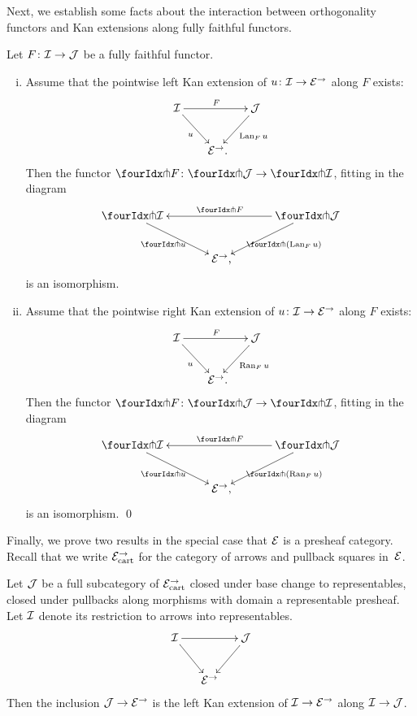\documentclass[reqno,10pt,a4paper,oneside,draft]{amsart}
\begin{document}
{{Next, we establish some facts about the interaction between orthogonality functors and Kan extensions along fully faithful functors. 

\begin{proposition} \label{kan-extension-closure}
Let $F \co \cal{I} \to \cal{J}$ be a fully faithful functor.
\begin{enumerate}[(i)]
\item Assume that the pointwise left Kan extension of $u \co \cal{I} \to \catE^\to$ along $F$ exists:
\[
\xymatrix@!C@C-1em{
  \cal{I}
  \ar[dr]_{u}
  \ar[rr]^{F}
&&
  \cal{J}
  \ar[dl]^{\Lan_F u}
\\&
  \catE^\to
\rlap{.}}
\]
Then the functor $\liftr{F} \co \liftr{\cal{J}} \to \liftr{\cal{I}}$, fitting in the diagram
\[
\xymatrix@!C@C-1em{
  \liftr{\cal{I}}
  \ar[dr]_{\liftr{u}}
&&
  \liftr{\cal{J}}
  \ar[ll]_{\liftr{F}}
  \ar[dl]^{\liftr{(\Lan_F u)}}
\\&
  \catE^\to
\rlap{,}}
\]
is an isomorphism.
\item Assume that the pointwise right Kan extension of $u \co \cal{I} \to \catE^\to$ along $F$ exists:
\[
\xymatrix@!C@C-1em{
  \cal{I}
  \ar[dr]_{u}
  \ar[rr]^{F}
&&
  \cal{J}
  \ar[dl]^{\Ran_F u}
\\&
  \catE^\to
\rlap{.}}
\]
Then the functor $\liftl{F} \co \liftl{\cal{J}} \to \liftl{\cal{I}}$, fitting in the diagram
\[
\xymatrix@!C@C-1em{
  \liftl{\cal{I}}
  \ar[dr]_{\liftl{u}}
&&
  \liftl{\cal{J}}
  \ar[ll]_{\liftl{F}}
  \ar[dl]^{\liftl{(\Ran_F u)}}
\\&
  \catE^\to
\rlap{,}}
\]
is an isomorphism.
\qed
\end{enumerate}
\end{proposition}



Finally, we prove two results in the special case that $\catE$ is a presheaf category. Recall that
we write $\catE_{\cart}^\to$ for the category of arrows and pullback squares in~$\cal{E}$.

\begin{lemma} \label{left-kan-extension-of-representables}
Let $\cal{J}$ be a full subcategory of $\catE_{\cart}^\to$ closed under base change to representables, \ie closed under pullbacks along morphisms with domain a representable presheaf.
Let $\cal{I}$ denote its restriction to arrows into representables.
\[
\xymatrix@C-1em{
  \cal{I}
  \ar[rr]
  \ar[dr]
&&
  \cal{J}
  \ar[dl]
\\&
  \catE^\to
}
\]
Then the inclusion $\cal{J} \to \catE^\to$ is the left Kan extension of $\cal{I} \to \catE^\to$ along $\cal{I} \to \cal{J}$.
\end{lemma}

}}
\end{document}
